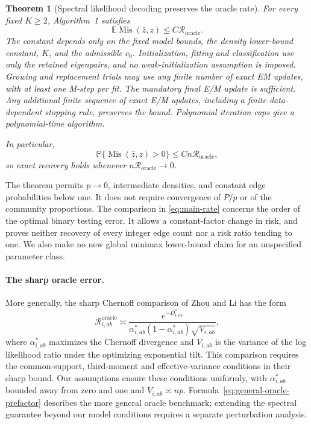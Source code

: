 \documentclass[11pt]{article}
\newtheorem{theorem}{Theorem}[section]
\theoremstyle{definition}
\theoremstyle{remark}
\newcommand{\Mis}{\operatorname{Mis}}
\newcommand{\E}{\mathbb E}
\newcommand{\PP}{\mathbb P}
\newcommand{\Roracle}{\mathcal R_{\mathrm{oracle}}}
\numberwithin{equation}{section}
\begin{document}
\begin{theorem}[Spectral likelihood decoding preserves the oracle rate]
\label{thm:main-recovery}
For every fixed $K\ge2$, Algorithm~1 satisfies
\begin{equation}
 \E\Mis(\widehat z,z)
 \le C\Roracle.
 \label{eq:main-rate}
\end{equation}
The constant depends only on the fixed model bounds, the density lower-bound constant, $K$, and the admissible $c_0$. Initialization, fitting and classification use only the retained eigenpairs, and no weak-initialization assumption is imposed. Growing and replacement trials may use any finite number of exact EM updates, with at least one M-step per fit. The mandatory final E/M update is sufficient. Any additional finite sequence of exact E/M updates, including a finite data-dependent stopping rule, preserves the bound. Polynomial iteration caps give a polynomial-time algorithm.

In particular,
\[
 \PP\{\Mis(\widehat z,z)>0\}
 \le Cn\Roracle,
\]
so exact recovery holds whenever $n\Roracle\to0$.
\end{theorem}

The theorem permits $p\to0$, intermediate densities, and constant edge probabilities below one. It does not require convergence of $P/p$ or of the community proportions. The comparison in \eqref{eq:main-rate} concerns the order of the optimal binary testing error. It allows a constant-factor change in risk, and proves neither recovery of every integer edge count nor a risk ratio tending to one. We also make no new global minimax lower-bound claim for an unspecified parameter class.

\paragraph{The sharp oracle error.}
More generally, the sharp Chernoff comparison of Zhou and Li has the form
\begin{equation}
 \mathcal R_{i,ab}^{\mathrm{oracle}}\asymp
 \frac{e^{-D^*_{i,ab}}}
 {\alpha^*_{i,ab}(1-\alpha^*_{i,ab})\sqrt{V_{i,ab}}},
 \label{eq:general-oracle-prefactor}
\end{equation}
where $\alpha^*_{i,ab}$ maximizes the Chernoff divergence and
$V_{i,ab}$ is the variance of the log likelihood ratio under the
optimizing exponential tilt. This comparison requires the common-support,
third-moment and effective-variance conditions in their sharp bound.
Our assumptions ensure these conditions uniformly, with
$\alpha^*_{i,ab}$ bounded away from zero and one and $V_{i,ab}\asymp np$.
Formula~\eqref{eq:general-oracle-prefactor} describes the more general
oracle benchmark; extending the spectral guarantee beyond our model
conditions requires a separate perturbation analysis.
\end{document}
